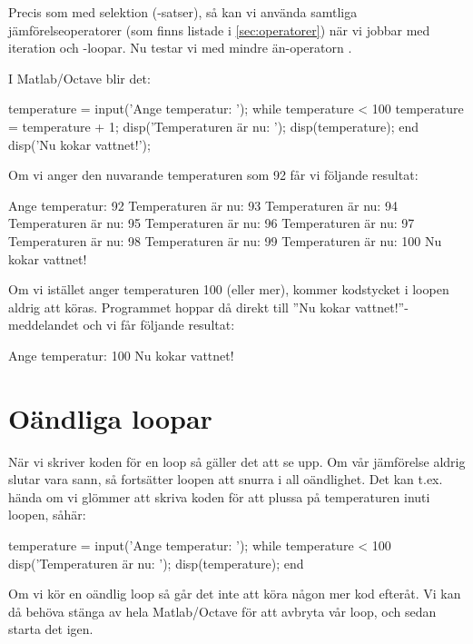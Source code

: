 Precis som med selektion (-satser), så kan vi använda samtliga jämförelseoperatorer (som finns listade i \autoref{sec:operatorer}) när vi jobbar med iteration och -loopar. Nu testar vi med mindre än-operatorn \cw{<}.

I Matlab/Octave blir det:

\begin{matlab}[caption={Vår första while-loop},label={}]
temperature = input('Ange temperatur: ');
while temperature < 100
	temperature = temperature + 1;
	disp('Temperaturen är nu: ');
	disp(temperature);
end
disp('Nu kokar vattnet!');
\end{matlab}

Om vi anger den nuvarande temperaturen som 92 får vi följande resultat:

\vspace{10pt}
\begin{matlab}
Ange temperatur: 92
Temperaturen är nu:
93
Temperaturen är nu:
94
Temperaturen är nu:
95
Temperaturen är nu:
96
Temperaturen är nu:
97
Temperaturen är nu:
98
Temperaturen är nu:
99
Temperaturen är nu:
100
Nu kokar vattnet!
\end{matlab}

Om vi istället anger temperaturen 100 (eller mer), kommer kodstycket i loopen aldrig att köras. Programmet hoppar då direkt till ''Nu kokar vattnet!''-meddelandet och vi får följande resultat:

\vspace{10pt}
\begin{matlab}
Ange temperatur: 100
Nu kokar vattnet!
\end{matlab}

\section{Oändliga loopar}
När vi skriver koden för en loop så gäller det att se upp. Om vår jämförelse aldrig slutar vara sann, så fortsätter loopen att snurra i all oändlighet. Det kan t.ex. hända om vi glömmer att skriva koden för att plussa på temperaturen inuti loopen, såhär:

\begin{matlab}[caption={Oändlig loop, varning!},label={}]
temperature = input('Ange temperatur: ');
while temperature < 100
	disp('Temperaturen är nu: ');
	disp(temperature);
end
\end{matlab}

Om vi kör en oändlig loop så går det inte att köra någon mer kod efteråt. Vi kan då behöva stänga av hela Matlab/Octave för att avbryta vår loop, och sedan starta det igen.
\newpage
